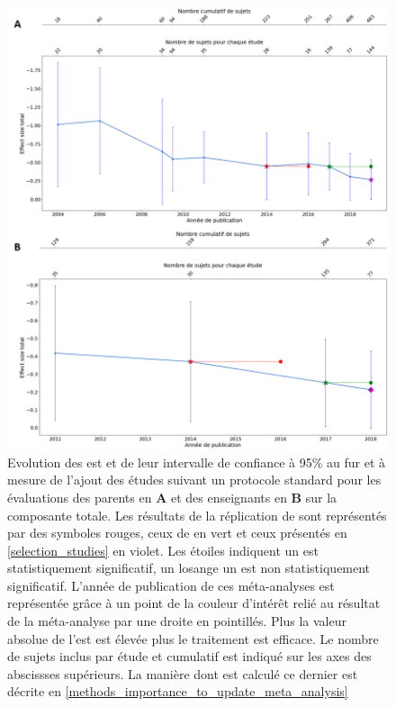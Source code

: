 \begin{figure}[t]
  \centering
	\includegraphics[width=1\linewidth]{figures/chapter-2/meta-analysis-evolution-summary-effect-std} 
  \caption[Evolution des \gls{est} au fur et à mesure de l'ajout de nouvelles études suivant un protocole standard.]{Evolution des \gls{est} et de leur 
	intervalle de confiance à 95\% au fur et à mesure de l'ajout des études suivant un protocole standard pour les évaluations des 
	parents en \textbf{A} et des enseignants en \textbf{B} sur la composante totale.
  Les résultats de la réplication de \citet{Cortese2016} sont représentés par des symboles rouges, ceux de \citet{Bussalb2019clinical} en vert et ceux présentés en \ref{selection_studies} en violet. Les étoiles 
	indiquent un \gls{est} statistiquement significatif, un losange un \gls{est} non statistiquement significatif. L'année de publication de ces méta-analyses est représentée grâce à un point de la couleur 
	d'intérêt relié au résultat de la méta-analyse par une droite en pointillés.
	Plus la valeur absolue de l'\gls{est} est élevée plus le traitement est efficace.
	Le nombre de sujets inclus par étude et cumulatif est indiqué sur les axes des abscissses supérieurs. La manière dont est calculé ce dernier est 
	décrite en \ref{methods_importance_to_update_meta_analysis}}
  \label{Figure:meta_analysis_evolution_est_std}
\end{figure}

